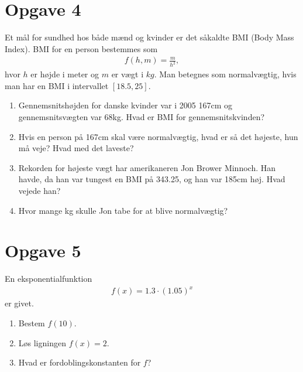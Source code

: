 \documentclass[12pt]{article}
\begin{document}
\section*{Opgave 4}
Et mål for sundhed hos både mænd og kvinder er det såkaldte BMI (Body Mass Index). BMI for en person bestemmes som
\begin{align*}
f(h,m) = \frac{m}{h^2},
\end{align*}
hvor $h$ er højde i meter og $m$ er vægt i $kg$. Man betegnes som normalvægtig, hvis man har en BMI i intervallet $[18.5,25]$. 
\begin{enumerate}
\item Gennemsnitshøjden for danske kvinder var i 2005 167cm og gennemsnitsvægten var 68kg. Hvad er BMI for gennemsnitskvinden?
\item Hvis en person på 167cm skal være normalvægtig, hvad er så det højeste, hun må veje? Hvad med det laveste?
\item Rekorden for højeste vægt har amerikaneren Jon Brower Minnoch. Han havde, da han var tungest en BMI på 343.25, og han var 185cm høj. Hvad vejede han?
\item Hvor mange kg skulle Jon tabe for at blive normalvægtig?
\end{enumerate}

\section*{Opgave 5}
En eksponentialfunktion
\begin{align*}
f(x) = 1.3\cdot (1.05)^x
\end{align*}
er givet. 
\begin{enumerate}[label=\roman*)]
\item Bestem $f(10)$.
\item Løs ligningen $f(x) = 2$.
\item Hvad er fordoblingskonstanten for $f$?
\end{enumerate}
\end{document}
